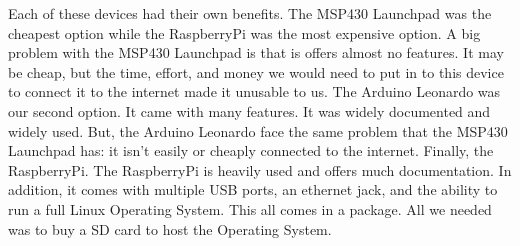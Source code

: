 \documentclass{report}
\begin{document}
\indent
Each of these devices had their own benefits. The MSP430 Launchpad was the cheapest option while the RaspberryPi was the most expensive option. A big problem with the MSP430 Launchpad is that is offers almost no features. It may be cheap, but the time, effort, and money we would need to put in to this device to connect it to the internet made it unusable to us.
\newline
\indent
The Arduino Leonardo was our second option. It came with many features. It was widely documented and widely used. But, the Arduino Leonardo face the same problem that the MSP430 Launchpad has: it isn't easily or cheaply connected to the internet.
\newline
\indent
Finally, the RaspberryPi. The RaspberryPi is heavily used and offers much documentation. In addition, it comes with multiple USB ports, an ethernet jack, and the ability to run a full Linux Operating System. This all comes in a  package. All we needed was to buy a  SD card to host the Operating System.
\newpage
\end{document}
